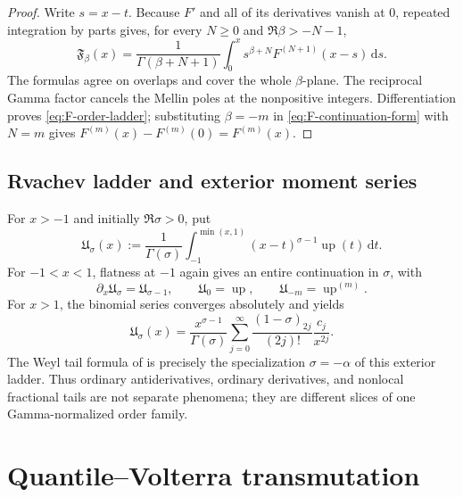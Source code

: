 \documentclass[11pt,oneside]{article}
\theoremstyle{definition}
\theoremstyle{remark}
\newcommand{\Up}{\operatorname{up}}
\newcommand{\dd}{\,\mathrm d}
\newcommand{\poch}[2]{\left(#1\right)_{#2}}
\begin{document}
\begin{proof}
Write $s=x-t$.  Because $F'$ and all of its derivatives vanish at $0$,
repeated integration by parts gives, for every $N\ge0$ and
$\Re\beta>-N-1$,
\begin{equation}
 \mathfrak F_\beta(x)
 =\frac1{\Gamma(\beta+N+1)}
   \int_0^x s^{\beta+N}F^{(N+1)}(x-s)\dd s.
 \label{eq:F-continuation-form}
\end{equation}
The formulas agree on overlaps and cover the whole $\beta$-plane.  The
reciprocal Gamma factor cancels the Mellin poles at the nonpositive integers.
Differentiation proves \eqref{eq:F-order-ladder}; substituting $\beta=-m$ in
\eqref{eq:F-continuation-form} with $N=m$ gives
$F^{(m)}(x)-F^{(m)}(0)=F^{(m)}(x)$.
\end{proof}

\subsection{Rvachev ladder and exterior moment series}

For $x>-1$ and initially $\Re\sigma>0$, put
\begin{equation}
 \mathfrak U_\sigma(x)
 :=\frac1{\Gamma(\sigma)}
   \int_{-1}^{\min(x,1)}(x-t)^{\sigma-1}\Up(t)\dd t.
 \label{eq:up-entire-ladder}
\end{equation}
For $-1<x<1$, flatness at $-1$ again gives an entire continuation in
$\sigma$, with
\begin{equation}
 \partial_x\mathfrak U_\sigma=\mathfrak U_{\sigma-1},
 \qquad
 \mathfrak U_0=\Up,
 \qquad
 \mathfrak U_{-m}=\Up^{(m)}.
 \label{eq:up-entire-order-values}
\end{equation}
For $x>1$, the binomial series converges absolutely and yields
\begin{equation}
 \mathfrak U_\sigma(x)
 =\frac{x^{\sigma-1}}{\Gamma(\sigma)}
  \sum_{j=0}^{\infty}
  \frac{\poch{1-\sigma}{2j}}{(2j)!}
  \frac{c_j}{x^{2j}}.
 \label{eq:up-exterior-general-series}
\end{equation}
The Weyl tail formula of  is precisely the specialization
$\sigma=-\alpha$ of this exterior ladder.  Thus ordinary antiderivatives,
ordinary derivatives, and nonlocal fractional tails are not separate
phenomena; they are different slices of one Gamma-normalized order family.

\section{Quantile--Volterra transmutation}
\label{sec:quantile-transmutation}
\end{document}

